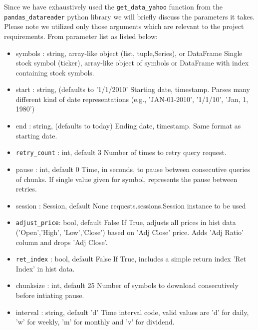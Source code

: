 Since we have exhaustively used the \texttt{get\_data\_yahoo} function from the \texttt{pandas\_datareader} python library we will briefly discuss the parameters it takes. 
Please note we utilized only those arguments which are relevant to the project requirements. From \cite{Ref7} parameter list as listed below:

\begin{itemize}

\item symbols : string, array-like object (list, tuple,Series), or DataFrame Single stock symbol (ticker), array-like object of symbols or DataFrame with index containing stock symbols.
\item start : string, (defaults to '1/1/2010' Starting date, timestamp. Parses many different kind of date representations (e.g., 'JAN-01-2010', '1/1/10', 'Jan, 1, 1980')
\item end : string, (defaults to today) Ending date, timestamp. Same format as starting  date.
\item \texttt{retry\_count} : int, default 3 Number of times to retry query request.
\item pause : int, default 0 Time, in seconds, to pause between consecutive queries of chunks. If single value given for  symbol, represents the pause between retries.
\item session : Session, default None requests.sessions.Session instance to be used
\item \texttt{adjust\_price}: bool, default False If True, adjusts all prices in hist data ('Open','High', 'Low','Close') based on 'Adj Close' price. Adds 'Adj Ratio' column and drops 'Adj Close'.
\item \texttt{ret\_index} : bool, default False If True, includes a simple return index 'Ret Index' in hist data.
\item chunksize : int, default 25 Number of symbols to download consecutively before intiating pause.
\item interval : string, default 'd' Time interval code, valid values are 'd' for daily, 'w' for weekly, 'm' for monthly and 'v' for dividend.
\end{itemize}


